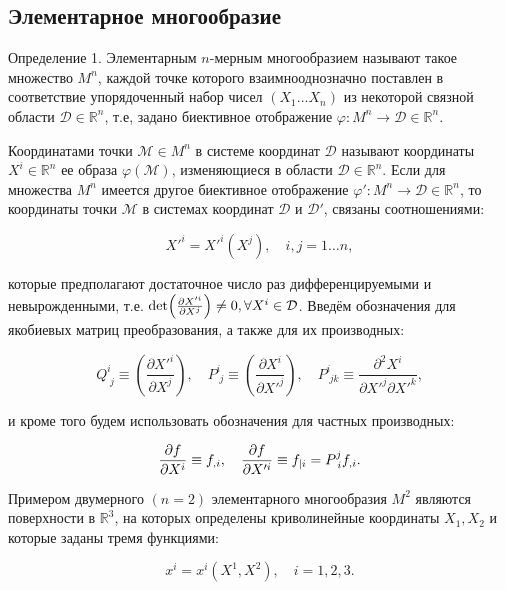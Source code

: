 \documentclass[14pt,a4paper]{scrartcl}
\begin{document}
\subsection{Элементарное многообразие}
Определение 1. Элементарным $n$-мерным многообразием называют такое множество $M^n$, каждой точке которого
взаимнооднозначно поставлен в соответствие упорядоченный набор чисел $(X_1...X_n)$ из некоторой связной области $\mathcal{D} \in \mathbb{R}^n$, т.е, задано биективное отображение $\varphi: M^n \longrightarrow \mathcal{D} \in \mathbb{R}^n$.

Координатами точки $\mathcal{M} \in M^n$ в системе координат $\mathcal{D}$ называют координаты $X^i \in \mathbb{R}^n$ ее образа $\varphi(\mathcal{M})$, изменяющиеся в области $\mathcal{D} \in \mathbb{R}^n$.
Если для множества $M^n$ имеется другое биективное отображение $\varphi': M^n \longrightarrow \mathcal{D} \in \mathbb{R}^n$, то координаты точки $\mathcal{M}$ в системах координат $\mathcal{D}$ и $\mathcal{D'}$, связаны соотношениями:

\begin{equation}\label{e1}
	X'^i = X'^i(X^j), \quad i,j=1\dots n,
\end{equation}

которые предполагают достаточное число раз дифференцируемыми и невырожденными, т.е. $\det (\pdv{X'^i}{X^j}) \neq 0, \forall X^i \in \mathcal{D}$.
Введём обозначения для якобиевых матриц преобразования, а также для их производных:

\begin{equation}\label{eq2}
	Q_{\; j}^{i} \equiv\left(\frac{\partial X'^{i}}{\partial X^{j}}\right), \quad P_{\; j}^{i} \equiv\left(\frac{\partial X^{i}}{\partial X'^{j}}\right), \quad P_{\; j k}^{i} \equiv \frac{\partial^{2} X^{i}}{\partial X'^{j} \partial X'^{k}},
\end{equation}

и кроме того будем использовать обозначения для частных производных:

\begin{equation}\label{eq3}
	\pdv{f}{X^i} \equiv f_{,i}, \quad \pdv{f}{X'^i} \equiv f_{|i} = P_{\; i}^j f_{,i}.
\end{equation}

Примером двумерного $(n = 2)$ элементарного многообразия $M^2$ являются поверхности в $\mathbb{R}^3$, на которых определены криволинейные координаты $X_1, X_2$ и которые заданы тремя функциями:

\begin{equation}\label{eq4}
	x^i = x^{i}(X^1, X^2), \quad i=1,2,3.
\end{equation}
\end{document}
